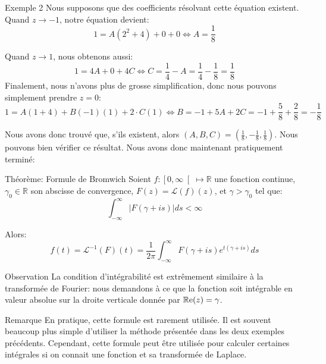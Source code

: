 \documentclass[a4paper]{article}
\begin{document}
\begin{parag}{Exemple 2}
    Nous supposons que des coefficients résolvant cette équation existent. Quand $z \to -1$, notre équation devient: 
    \[1 = A\left(2^2 + 4\right) + 0 + 0 \iff A = \frac{1}{8}\]
    
    Quand $z \to 1$, nous obtenons aussi: 
    \[1 = 4A + 0 + 4C \iff C = \frac{1}{4} - A = \frac{1}{4} - \frac{1}{8} = \frac{1}{8}\]
    Finalement, nous n'avons plus de grosse simplification, donc nous pouvons simplement prendre $z = 0$: 
    \[1 = A\left(1 + 4\right) + B\left(-1\right)\left(1\right) + 2\cdot C\left(1\right) \iff B = -1 + 5A + 2C = -1 + \frac{5}{8} + \frac{2}{8} = -\frac{1}{8}\]

    Nous avons donc trouvé que, s'ils existent, alors $\left(A, B, C\right) = \left(\frac{1}{8}, -\frac{1}{8}, \frac{1}{8}\right)$. Nous pouvons bien vérifier ce résultat. Nous avons donc maintenant pratiquement terminé: 
\end{parag}

\begin{parag}{Théorème: Formule de Bromwich}
    Soient $f: \left[0, \infty\right[ \mapsto \mathbb{R}$ une fonction continue, $\gamma_0 \in \mathbb{R}$ son abscisse de convergence, $F\left(z\right) = \mathcal{L}\left(f\right)\left(z\right)$, et $\gamma > \gamma_0$ tel que: 
    \[\int_{-\infty}^{\infty} \left|F\left(\gamma + is\right)\right|ds < \infty\]

    Alors: 
    \[f\left(t\right) = \mathcal{L}^{-1}\left(F\right)\left(t\right) = \frac{1}{2\pi}\int_{-\infty}^{\infty} F\left(\gamma + is\right) e^{t\left(\gamma + is\right)}ds\]
    
    
    \begin{subparag}{Observation}
        La condition d'intégrabilité est extrêmement similaire à la transformée de Fourier: nous demandons à ce que la fonction soit intégrable en valeur absolue sur la droite verticale donnée par $\cre\left(z\right) = \gamma$.
    \end{subparag}

    \begin{subparag}{Remarque}
        En pratique, cette formule est rarement utilisée. Il est souvent beaucoup plus simple d'utiliser la méthode présentée dans les deux exemples précédents. Cependant, cette formule peut être utilisée pour calculer certaines intégrales si on connait une fonction et sa transformée de Laplace.
    \end{subparag}
\end{parag}
\end{document}
